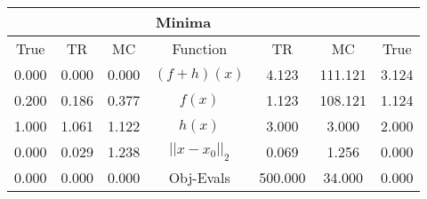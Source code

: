 \begin{tabular}{| c |c |c || c |c |c |c |}
    \hline
    \rowcolor[gray]{0.9}
\multicolumn{3}{|c|}{Parameters} & \multicolumn{4}{|c|}{Minima}\\ \hline True & TR & MC  & Function & TR & MC & True \\
    \hline
  \rowcolor[gray]{0.7}
  0.000 & 0.000 & 0.000   & $ (f + h)(x) $ & 4.123 & 111.121 & 3.124 \\
  \rowcolor[gray]{0.8}
  0.200 & 0.186 & 0.377   & $ f(x) $ & 1.123 & 108.121 & 1.124 \\
  \rowcolor[gray]{0.7}
  1.000 & 1.061 & 1.122   & $ h(x) $ & 3.000 & 3.000 & 2.000 \\
  \rowcolor[gray]{0.8}
  0.000 & 0.029 & 1.238   & $ ||x - x_0||_2 $ & 0.069 & 1.256 & 0.000 \\
  \rowcolor[gray]{0.7}
  0.000 & 0.000 & 0.000   & Obj-Evals & 500.000 & 34.000 & 0.000 \\
\end{tabular}
